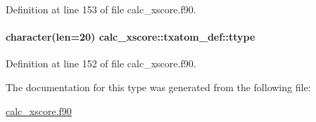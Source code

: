 Definition at line 153 of file calc\-\_\-xscore.\-f90.

\hypertarget{structcalc__xscore_1_1txatom__def_a3fe66b31c2ef6d9b4f01fa236ed60cbe}{
\paragraph[{ttype}]{\setlength{\rightskip}{0pt plus 5cm}character(len=20) calc\-\_\-xscore\-::txatom\-\_\-def\-::ttype}}\label{structcalc__xscore_1_1txatom__def_a3fe66b31c2ef6d9b4f01fa236ed60cbe}


Definition at line 152 of file calc\-\_\-xscore.\-f90.



The documentation for this type was generated from the following file\-:\begin{DoxyCompactItemize}
\item 
\hyperlink{calc__xscore_8f90}{calc\-\_\-xscore.\-f90}\end{DoxyCompactItemize}
